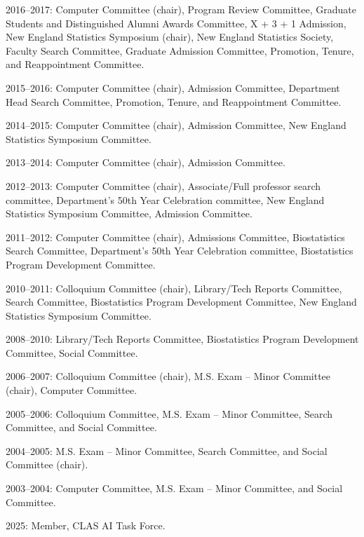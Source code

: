 \documentclass[Statistics]{vita}
\begin{document}
\begin{vita}
\begin{Services}
\begin{DepartmentalService}
  \item 2016--2017: Computer Committee (chair), Program Review Committee, Graduate Students and Distinguished Alumni Awards Committee, X + 3 + 1 Admission, New England Statistics Symposium (chair), New England Statistics Society, Faculty Search Committee, Graduate Admission Committee, Promotion, Tenure, and Reappointment Committee.
  \item 2015--2016: Computer Committee (chair), Admission Committee, Department Head Search Committee, Promotion, Tenure, and Reappointment Committee.
  \item 2014--2015: Computer Committee (chair), Admission Committee, New England Statistics Symposium Committee.
  \item 2013--2014: Computer Committee (chair), Admission Committee.
  \item 2012--2013: Computer Committee (chair), Associate/Full professor search committee, Department's 50th Year Celebration committee, New England Statistics Symposium Committee, Admission Committee.
  \item 2011--2012: Computer Committee (chair), Admissions Committee, Biostatistics Search Committee,  Department's 50th Year Celebration committee, Biostatistics Program Development Committee.
  \item 2010--2011: Colloquium Committee (chair), Library/Tech Reports Committee, Search Committee, Biostatistics Program Development Committee, New England Statistics Symposium Committee.
  \item 2008--2010: Library/Tech Reports Committee, Biostatistics Program Development Committee, Social Committee.
  \item 2006--2007: Colloquium Committee (chair), M.S. Exam -- Minor Committee (chair), Computer Committee.
  \item 2005--2006: Colloquium Committee, M.S. Exam -- Minor Committee, Search Committee, and Social Committee.
  \item 2004--2005: M.S. Exam -- Minor Committee, Search Committee, and Social Committee (chair).
  \item 2003--2004: Computer Committee, M.S. Exam -- Minor Committee, and Social Committee.
  \end{DepartmentalService}
  \begin{InstitutionalService}
  \item 2025: Member, CLAS AI Task Force.
  \end{InstitutionalService}
  \begin{Outreaches}

\end{Outreaches}
\end{Services}
\end{vita}
\end{document}
